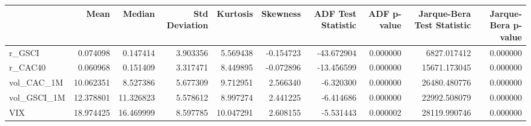 \begin{tabular}{lrrrrrrrrr}
\toprule
 & Mean & Median & Std Deviation & Kurtosis & Skewness & ADF Test Statistic & ADF p-value & Jarque-Bera Test Statistic & Jarque-Bera p-value \\
\midrule
r_GSCI & 0.074098 & 0.147414 & 3.903356 & 5.569438 & -0.154723 & -43.672904 & 0.000000 & 6827.017412 & 0.000000 \\
r_CAC40 & 0.060968 & 0.151409 & 3.317471 & 8.449895 & -0.072896 & -13.456599 & 0.000000 & 15671.173045 & 0.000000 \\
vol_CAC_1M & 10.062351 & 8.527386 & 5.677309 & 9.712951 & 2.566340 & -6.320300 & 0.000000 & 26480.480776 & 0.000000 \\
vol_GSCI_1M & 12.378801 & 11.326823 & 5.578612 & 8.997274 & 2.441225 & -6.414686 & 0.000000 & 22992.508079 & 0.000000 \\
VIX & 18.974425 & 16.469999 & 8.597785 & 10.047291 & 2.608155 & -5.531443 & 0.000002 & 28119.990746 & 0.000000 \\
\bottomrule
\end{tabular}
